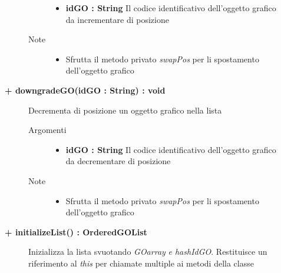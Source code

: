 \begin{description}
\begin{description}
\begin{description}
\begin{itemize}
					\item \textbf{idGO : String			} \hfill
					Il codice identificativo dell'oggetto grafico da incrementare di posizione
					
				\end{itemize}
				
			\item[Note] \hfill
			\begin{itemize}
					\item Sfrutta il metodo privato \textit{swapPos} per li spostamento dell'oggetto grafico
					
			\end{itemize}
		\end{description}
	\end{description}
	
	\begin{description}
		\item[\textbf{\color{blue}+ downgradeGO(idGO : String) : void			}] \hfill
			Decrementa di posizione un oggetto grafico nella lista
			
		\begin{description}
			\item[Argomenti] \hfill
				\begin{itemize}
				
					\item \textbf{idGO : String			} \hfill
					Il codice identificativo dell'oggetto grafico da decrementare di posizione
					
				\end{itemize}
				
			\item[Note] \hfill
			\begin{itemize}
					\item Sfrutta il metodo privato \textit{swapPos} per li spostamento dell'oggetto grafico
					
			\end{itemize}
		\end{description}
	\end{description}
	
	\begin{description}
		\item[\textbf{\color{blue}+ initializeList() : OrderedGOList			}] \hfill
			Inizializza la lista svuotando \textit{GOarray} \textit{e hashIdGO}. Restituisce un riferimento al \textit{this} per chiamate multiple ai metodi della classe 
			
	\end{description}
	
		
	

\end{description}
